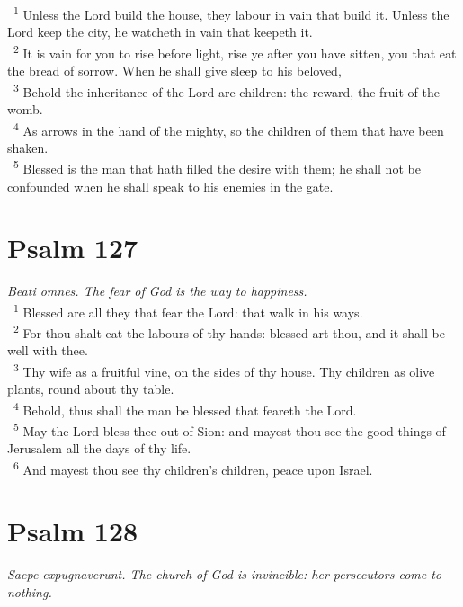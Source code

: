 \documentclass[a5paper,12pt]{article}
\begin{document}
\begin{multicols*}{2}
~\textsuperscript{1} Unless the Lord build the house, they labour in vain that build it. Unless the Lord keep the city, he watcheth in vain that keepeth it.\\
~\textsuperscript{2} It is vain for you to rise before light, rise ye after you have sitten, you that eat the bread of sorrow. When he shall give sleep to his beloved,\\
~\textsuperscript{3} Behold the inheritance of the Lord are children: the reward, the fruit of the womb.\\
~\textsuperscript{4} As arrows in the hand of the mighty, so the children of them that have been shaken.\\
~\textsuperscript{5} Blessed is the man that hath filled the desire with them; he shall not be confounded when he shall speak to his enemies in the gate.\\

\section{Psalm 127}
\label{sec:org5c35dd0}
\emph{Beati omnes. The fear of God is the way to happiness.}\\

~\textsuperscript{1} Blessed are all they that fear the Lord: that walk in his ways.\\
~\textsuperscript{2} For thou shalt eat the labours of thy hands: blessed art thou, and it shall be well with thee.\\
~\textsuperscript{3} Thy wife as a fruitful vine, on the sides of thy house. Thy children as olive plants, round about thy table.\\
~\textsuperscript{4} Behold, thus shall the man be blessed that feareth the Lord.\\
~\textsuperscript{5} May the Lord bless thee out of Sion: and mayest thou see the good things of Jerusalem all the days of thy life.\\
~\textsuperscript{6} And mayest thou see thy children's children, peace upon Israel.\\

\section{Psalm 128}
\label{sec:org138a64f}
\emph{Saepe expugnaverunt. The church of God is invincible: her persecutors come to nothing.}\\


\end{multicols*}
\end{document}
